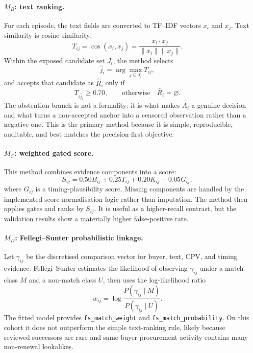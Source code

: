 \documentclass[11pt,a4paper]{article}
\newcommand{\code}[1]{\texttt{#1}}
\begin{document}
\paragraph{\(M_B\): text ranking.}
For each episode, the text fields are converted to TF--IDF vectors \(x_i\) and
\(x_j\). Text similarity is cosine similarity:
\[
T_{ij}=\cos(x_i,x_j)=\frac{x_i\cdot x_j}{\|x_i\|\|x_j\|}.
\]
Within the exposed candidate set \(J_i\), the method selects
\[
\hat{j}_i=\arg\max_{j\in J_i} T_{ij},
\]
and accepts that candidate as \(\hat{R}_i\) only if
\[
T_{i\hat{j}_i}\geq 0.70,
\qquad\text{otherwise}\quad \hat{R}_i=\varnothing .
\]
The abstention branch is not a formality: it is what makes \(A_i\) a genuine
decision and what turns a non-accepted anchor into a censored observation rather
than a negative one.
This is the primary method because it is simple, reproducible, auditable, and
best matches the precision-first objective.

\paragraph{\(M_C\): weighted gated score.}
This method combines evidence components into a score:
\[
S_{ij}=0.50B_{ij}+0.25T_{ij}+0.20K_{ij}+0.05G_{ij},
\]
where \(G_{ij}\) is a timing-plausibility score. Missing components are handled
by the implemented score-normalisation logic rather than imputation. The method
then applies gates and ranks by \(S_{ij}\). It is useful as a higher-recall
contrast, but the validation results show a materially higher false-positive
rate.

\paragraph{\(M_D\): Fellegi--Sunter probabilistic linkage.}
Let \(\gamma_{ij}\) be the discretised comparison vector for buyer, text, CPV,
and timing evidence. Fellegi--Sunter estimates the likelihood of observing
\(\gamma_{ij}\) under a match class \(M\) and a non-match class \(U\), then uses
the log-likelihood ratio
\[
w_{ij}=\log\frac{P(\gamma_{ij}\mid M)}{P(\gamma_{ij}\mid U)}.
\]
The fitted model provides \code{fs\_match\_weight} and
\code{fs\_match\_probability}. On this cohort it does not outperform the
simple text-ranking rule, likely because reviewed successors are rare and
same-buyer procurement activity contains many non-renewal lookalikes.
\end{document}
